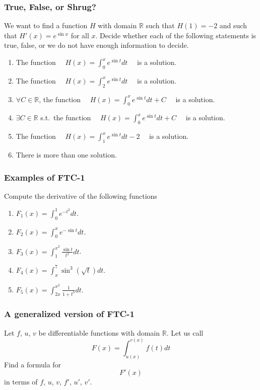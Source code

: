 \documentclass[14pt]{beamer}
\newcommand {\DS} [1] {${\displaystyle #1}$}
\newcommand {\R}{\mathbb{R}}
\newcommand{\setsize}[1]{\fontsize{#1}{#1}\selectfont} %
\newcommand{\smallerfont}{\setsize{13}} %
\begin{document}
\begin{frame}[t]
\setsize{11}
\frametitle{True, False, or Shrug?}

We want to find a function $H$ with domain $\R$ such that \DS{H(1) = -2} and such that
		  \DS{H'(x) = e^{\sin x}} for all $x$.
Decide whether each of the following statements is true, false, or we do not have enough information to decide. 

\begin{enumerate}
	\item  The function \DS{\quad H(x) = \int_0^x e^{\sin t} dt \quad} is a solution.
	\item  The function \DS{\quad H(x) = \int_2^x e^{\sin t} dt \quad} is a solution.
	\item $\forall C \in \R$, the function  \DS{\quad H(x) = \int_0^x e^{\sin t} dt + C \quad} is a solution. 
	\item $\exists C \in \R$ s.t.\ the function \DS{\quad H(x) = \int_0^x e^{\sin t} dt + C \quad } is a solution.
	\item The function \DS{\quad H(x) = \int_1^x e^{\sin t} dt -2 \quad} is a solution.
	\item There is more than one solution.
\end{enumerate}

\end{frame}
\begin{frame}[t]
\smallerfont
\frametitle{Examples of FTC-1}

Compute the derivative of the following functions

	\begin{enumerate}
		\item  \DS{F_1(x) = \int_0^1 e^{-t^2} dt}. \\
	\vfill 
				
		\item   \DS{F_2(x) = \int_0^x e^{-\sin t} dt}. \\
	\vfill 
		
		\item  \DS{F_3(x) = \int_1^{x^2} \frac{\sin t}{t^2} dt}. \\
	\vfill 
		
		\item  \DS{F_4(x) = \! \int_x^7 \sin^3 \! \! \left( \sqrt{t} \right) \! dt}. \\
	\vfill 
		
		\item  \DS{F_5(x) = \int_{2x}^{x^2} \frac{1}{1+t^3} dt}. \\
	\end{enumerate}

\end{frame}
\begin{frame}[t]
\frametitle{A generalized version of FTC-1}

Let $f$, $u$, $v$ be differentiable functions with domain $\R$.
Let us call
	$$
		F(x) = \int_{u(x)}^{v(x)} f(t) dt
	$$
Find a formula for 
	$$
		F'(x)
	$$
in terms of $f$, $u$, $v$, $f'$, $u'$, $v'$.

\end{frame}
\end{document}

